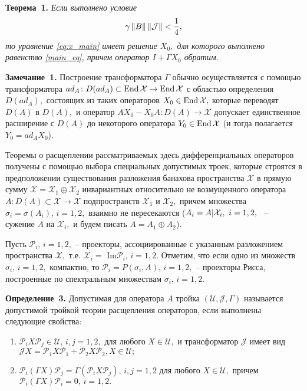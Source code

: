 \textbf{Теорема~1.}
{ \it Если выполнено условие 
\begin{equation}
 \gamma \left\|B\right\| \left\|\mathcal{J}\right\| < \frac{1}{4},
 \label{cond_normB_normJ}
\end{equation}
то уравнение \eqref{eq:x_main} имеет решение $X_0,$ для которого выполнено равенство \eqref{main_eq}, причем оператор $I + \Gamma X_0$ обратим.
}

\textbf{Замечание~1.}
Построение трансформатора $\Gamma$ обычно осуществляется с помощью трансформатора $ad_A \colon D(ad_A) \subset \operatorname{End} \mathcal{X} \to \operatorname{End} \mathcal{X}$ с областью определения $D(ad_A),$ состоящих из таких операторов  $X_0 \in \operatorname{End} \mathcal{X},$ которые переводят $D(A)$ в $D(A),$ и оператор $AX_0 - X_0A \colon D(A) \to \mathcal{X}$ допускает единственное расширение с $D(A)$ до некоторого оператора $Y_0 \in \operatorname{End} \mathcal{X}$ (и тогда полагается $Y_0 = ad_A X_0$).

Теоремы о расщеплении рассматриваемых здесь дифференциальных операторов получены с помощью выбора специальных допустимых троек, которые строятся в предположении существования разложения банахова пространства $\mathcal{X}$ в прямую сумму $\mathcal{X} = \mathcal{X}_1 \oplus \mathcal{X}_2$ инвариантных относительно не возмущенного оператора $A \colon D(A) \subset \mathcal{X} \to \mathcal{X}$ подпространств $\mathcal{X}_1$ и $\mathcal{X}_2,$ причем множества $\sigma_i = \sigma(A_i), \, i = 1,2,$ взаимно не пересекаются (${A_i = A|\mathcal{X}_i,} \enskip {i = 1,2,}$~ --~ сужение $A$ на $\mathcal{X}_i,$ и будем писать $A = A_1 \oplus A_2$).

Пусть $\mathcal{P}_i, \, i = 1,2,$ -- проекторы, ассоциированные с указанным разложением пространства $\mathcal{X},$ т.е. $\mathcal{X}_i =$ Im$\mathcal{P}_i, \, i = 1,2.$ Отметим, что если одно из множеств $\sigma_i, \, i = 1,2,$ компактно, то $\mathcal{P}_i = P(\sigma_i, A), \, i = 1,2,$ -- проекторы Рисса, построенные по спектральным множествам $\sigma_i, \, i = 1,2.$

\textbf{Определение~3.}
Допустимая для оператора $A$ тройка $(\mathcal{U}, \mathcal{J}, \Gamma)$ называется допустимой тройкой теории расщепления операторов, если выполнены следующие свойства:
\begin{enumerate}
\item $\mathcal{P}_i X \mathcal{P}_j \in \mathcal{U}, \, i,j = 1,2,$ для любого $X \in \mathcal{U},$ и трансформатор $\mathcal{J}$ имеет вид $\mathcal{J}X = \mathcal{P}_1 X \mathcal{P}_1 + \mathcal{P}_2 X \mathcal{P}_2, X \in \mathcal{U};$
\item $\mathcal{P}_i (\Gamma X)\mathcal{P}_j = \Gamma (\mathcal{P}_i X \mathcal{P}_j), \, i,j = 1,2$ для любого $X \in \mathcal{U},$ причем \linebreak $\mathcal{P}_i (\Gamma X)\mathcal{P}_i = 0, \, i = 1,2.$ 
\end{enumerate}

